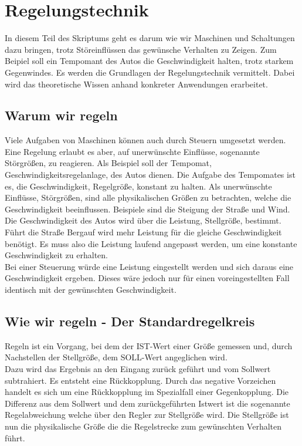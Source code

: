 \documentclass[
  letterpaper,
  DIV=11]{scrreprt}
\begin{document}
\chapter{Regelungstechnik}\label{regelungstechnik}

In diesem Teil des Skriptums geht es darum wie wir Maschinen und
Schaltungen dazu bringen, trotz Störeinflüssen das gewünsche Verhalten
zu Zeigen. Zum Beipiel soll ein Tempomant des Autos die Geschwindigkeit
halten, trotz starkem Gegenwindes. Es werden die Grundlagen der
Regelungstechnik vermittelt. Dabei wird das theoretische Wissen anhand
konkreter Anwendungen erarbeitet.

\section{Warum wir regeln}\label{warum-wir-regeln}

Viele Aufgaben von Maschinen können auch durch Steuern umgesetzt werden.
Eine Regelung erlaubt es aber, auf unerwünschte Einflüsse, sogenannte
Störgrößen, zu reagieren. Als Beispiel soll der Tempomat,
Geschwindigkeitsregelanlage, des Autos dienen. Die Aufgabe des
Tempomates ist es, die Geschwindigkeit, Regelgröße, konstant zu halten.
Als unerwünschte Einflüsse, Störgrößen, sind alle physikalischen Größen
zu betrachten, welche die Geschwindigkeit beeinflussen. Beispiele sind
die Steigung der Straße und Wind.\\
Die Geschwindigkeit des Autos wird über die Leistung, Stellgröße,
bestimmt. Führt die Straße Bergauf wird mehr Leistung für die gleiche
Geschwindigkeit benötigt. Es muss also die Leistung laufend angepasst
werden, um eine konstante Geschwindigkeit zu erhalten.\\
Bei einer Steuerung würde eine Leistung eingestellt werden und sich
daraus eine Geschwindigkeit ergeben. Dieses wäre jedoch nur für einen
voreingestellten Fall identisch mit der gewünschten Geschwindigkeit.

\section{Wie wir regeln - Der
Standardregelkreis}\label{wie-wir-regeln---der-standardregelkreis}

Regeln ist ein Vorgang, bei dem der IST-Wert einer Größe gemessen und,
durch Nachstellen der Stellgröße, dem SOLL-Wert angeglichen wird.\\
Dazu wird das Ergebnis an den Eingang zurück geführt und vom Sollwert
subtrahiert. Es entsteht eine Rückkopplung. Durch das negative
Vorzeichen handelt es sich um eine Rückkopplung im Spezialfall einer
Gegenkopplung. Die Differenz aus dem Sollwert und dem zurückgeführten
Istwert ist die sogenannte Regelabweichung welche über den Regler zur
Stellgröße wird. Die Stellgröße ist nun die physikalische Größe die die
Regelstrecke zum gewünschten Verhalten führt.
\end{document}
